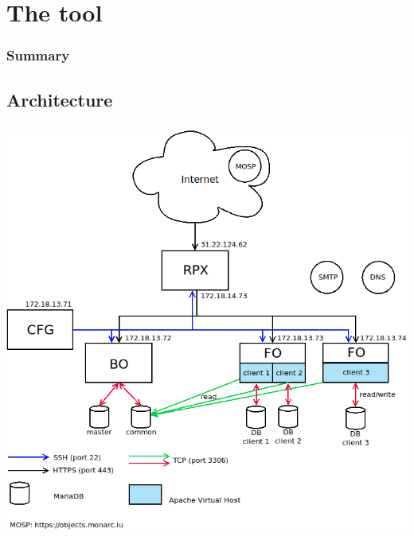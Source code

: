 %
%
\section{The tool}
\begin{frame}
    \frametitle{Summary}
\end{frame}
\subsection{Architecture}
\begin{frame}
    \frametitle{}
    \framesubtitle{}
    \begin{center}
        \includegraphics[scale=0.3]{../common_pictures/monarc-architecture.png}
    \end{center}
\end{frame}



